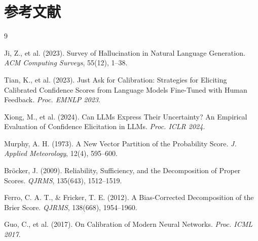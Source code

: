 \documentclass[10pt,a4paper,twocolumn]{article}
\begin{document}
\section*{参考文献}

\begin{thebibliography}{9}

Ji, Z., et al. (2023).
Survey of Hallucination in Natural Language Generation.
\textit{ACM Computing Surveys}, 55(12), 1--38.

Tian, K., et al. (2023).
Just Ask for Calibration: Strategies for Eliciting Calibrated Confidence Scores
from Language Models Fine-Tuned with Human Feedback.
\textit{Proc. EMNLP 2023}.

Xiong, M., et al. (2024).
Can LLMs Express Their Uncertainty? An Empirical Evaluation of Confidence
Elicitation in LLMs.
\textit{Proc. ICLR 2024}.

Murphy, A. H. (1973).
A New Vector Partition of the Probability Score.
\textit{J. Applied Meteorology}, 12(4), 595--600.

Bröcker, J. (2009).
Reliability, Sufficiency, and the Decomposition of Proper Scores.
\textit{QJRMS}, 135(643), 1512--1519.

Ferro, C. A. T., \& Fricker, T. E. (2012).
A Bias-Corrected Decomposition of the Brier Score.
\textit{QJRMS}, 138(668), 1954--1960.

Guo, C., et al. (2017).
On Calibration of Modern Neural Networks.
\textit{Proc. ICML 2017}.

\end{thebibliography}
\end{document}
